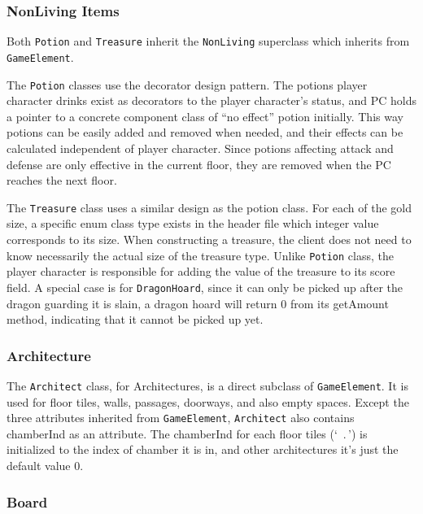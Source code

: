 \documentclass[11pt]{article}
\theoremstyle{plain} \newtheorem{theorem*}{Theorem}[subsection]
\begin{document}
\subsubsection{NonLiving Items}

Both \texttt{Potion} and \texttt{Treasure} inherit the \texttt{NonLiving}
superclass which inherits from \texttt{GameElement}.

The \texttt{Potion} classes use the decorator design pattern.  The potions
player character drinks exist as decorators to the player character’s status,
and PC holds a pointer to a concrete component class of “no effect” potion
initially.  This way potions can be easily added and removed when needed, and
their effects can be calculated independent of player character. Since potions
affecting attack and defense are only effective in the current floor, they are
removed when the PC reaches the next floor.  

The \texttt{Treasure} class uses a similar design as the potion class. For each
of the gold size, a specific enum class type exists in the header file which
integer value corresponds to its size. When constructing a treasure, the client
does not need to know necessarily the actual size of the treasure type. Unlike
\texttt{Potion} class, the player character is responsible for adding the value
of the treasure to its score field. A special case is for \texttt{DragonHoard},
since it can only be picked up after the dragon guarding it is slain, a
dragon hoard will return 0 from its \textsf{getAmount} method, 
indicating that it cannot be picked up yet.  


\subsubsection{Architecture}

The \texttt{Architect} class, for Architectures, is a direct subclass 
of \texttt{GameElement}. It is used for floor tiles, walls, passages, doorways,
and also empty spaces. Except the three attributes inherited from
\texttt{GameElement}, \texttt{Architect}
also contains \textsf{chamberInd} as an attribute.
The \textsf{chamberInd} for each floor tiles (`\ .\,') is initialized to
the index of chamber it is in, and other architectures it's just the default
value $0$.


\subsubsection{Board}
\end{document}
